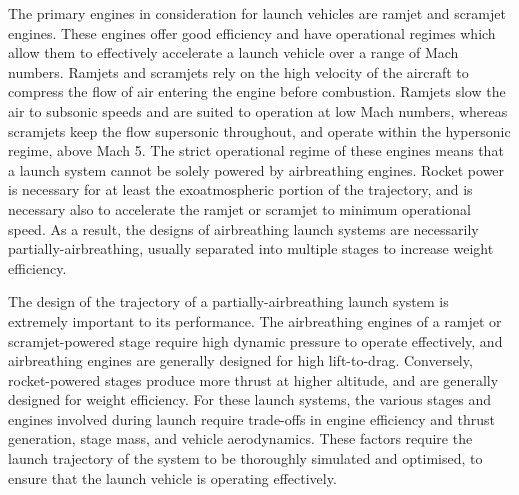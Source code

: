   	The primary engines in consideration for launch vehicles are ramjet and scramjet engines. These engines offer good efficiency and have operational regimes which allow them to effectively accelerate a launch vehicle over a range of Mach numbers. 
  	Ramjets and scramjets rely on the high velocity of the aircraft to compress the flow of air entering the engine before combustion.  Ramjets slow the air to subsonic speeds and are suited to operation at low Mach numbers, whereas scramjets keep the flow supersonic throughout, and operate within the hypersonic regime, above Mach 5. 
  	The strict operational regime of these engines means that a launch system cannot be solely powered by airbreathing engines. Rocket power is necessary for at least the exoatmospheric portion of the trajectory, and is necessary also to accelerate the ramjet or scramjet to minimum operational speed.
  	As a result, the designs of airbreathing launch systems are necessarily partially-airbreathing, usually separated into multiple stages to increase weight efficiency. 
  	 
  	 The design of the trajectory of a partially-airbreathing launch system is extremely important to its performance. 
  	   The airbreathing engines of a ramjet or scramjet-powered stage require high dynamic pressure to operate effectively, and airbreathing engines are generally designed for high lift-to-drag. Conversely, rocket-powered stages produce more thrust at higher altitude, and are generally designed for weight efficiency. For these launch systems, the various stages and engines involved during launch require trade-offs in engine efficiency and thrust generation, stage mass, and vehicle aerodynamics. These factors require the launch trajectory of the system to be thoroughly simulated and optimised, to ensure that the launch vehicle is operating effectively. 
 	  

